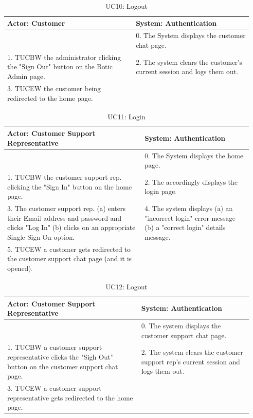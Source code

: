 \documentclass[11pt]{article}
\begin{document}
\begin{table}[h!]
	\centering
	\begin{tabular}{|p{8cm}|p{8cm}|}
		\hline
		Actor: Customer & System: Authentication \\
		\hline
		 & 0. The System displays the customer chat page.\\
		\hline
		1. TUCBW the administrator clicking the "Sign Out" button on the Botic Admin page. & 2. The system clears the customer's current session and logs them out. \\
		\hline
		3. TUCEW the customer being redirected to the home page. & \\
		\hline
	\end{tabular}
	\caption{UC10: Logout}
\end{table}

\begin{table}[h!]
	\centering
	\begin{tabular}{|p{8cm}|p{8cm}|}
		\hline
		Actor: Customer Support Representative & System: Authentication \\
		\hline
		 & 0. The System displays the home page.\\
		\hline
		1. TUCBW the customer support rep. clicking the "Sign In" button on the home page. & 2. The accordingly displays the login page.\\
		\hline
		3. The customer support rep. (a) enters their Email address and password and clicks "Log In" (b) clicks on an appropriate Single Sign On option. & 4. The system displays (a) an "incorrect login" error message (b) a "correct login" details message. \\
		\hline
		5. TUCEW a customer gets redirected to the customer support chat page (and it is opened). & \\
		\hline
	\end{tabular}
	\caption{UC11: Login}
\end{table}

\begin{table}[h!]
	\centering
	\begin{tabular}{|p{8cm}|p{8cm}|}
		\hline
		Actor: Customer Support Representative & System: Authentication \\
		\hline
		 & 0. The system displays the customer support chat page. \\
		\hline
		1. TUCBW a customer support representative clicks the "Sigh Out" button on the customer support chat page. & 2. The system clears the customer support rep's current session and logs them out. \\
		\hline
		3. TUCEW a customer support representative gets redirected to the home page. & \\
		\hline
	\end{tabular}
	\caption{UC12: Logout}
\end{table}
\end{document}

